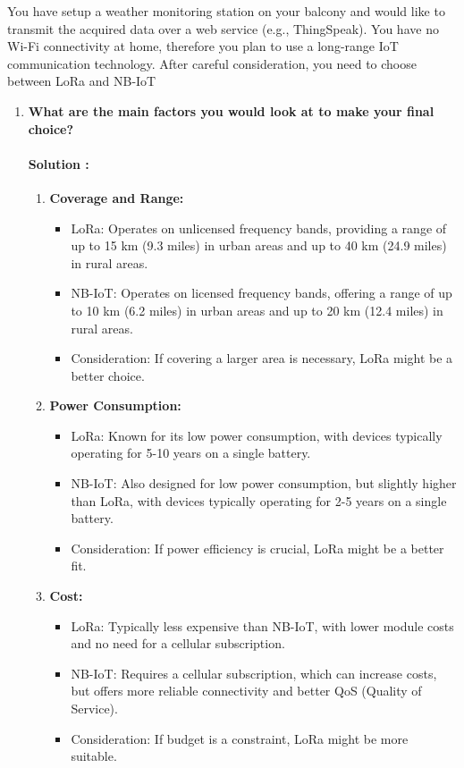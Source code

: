 \documentclass{article}
\begin{document}
You have setup a weather monitoring station on your balcony and would like to transmit the acquired data over a web service (e.g., ThingSpeak). You have no Wi-Fi connectivity at home, therefore you plan to use a long-range IoT communication technology. After careful consideration, you need to choose between LoRa and NB-IoT

\begin{enumerate}
    \item \textbf{What are the main factors you would look at to make your final choice?}

\paragraph{Solution :}

\begin{enumerate}
    \item \textbf{Coverage and Range:}
    \begin{itemize}
        \item LoRa: Operates on unlicensed frequency bands, providing a range of up to 15 km (9.3 miles) in urban areas and up to 40 km (24.9 miles) in rural areas.
        \item NB-IoT: Operates on licensed frequency bands, offering a range of up to 10 km (6.2 miles) in urban areas and up to 20 km (12.4 miles) in rural areas.
        \item Consideration: If covering a larger area is necessary, LoRa might be a better choice.
    \end{itemize}

    \item \textbf{Power Consumption:}
    \begin{itemize}
        \item LoRa: Known for its low power consumption, with devices typically operating for 5-10 years on a single battery.
        \item NB-IoT: Also designed for low power consumption, but slightly higher than LoRa, with devices typically operating for 2-5 years on a single battery.
        \item Consideration: If power efficiency is crucial, LoRa might be a better fit.
    \end{itemize}

    \item \textbf{Cost:}
    \begin{itemize}
        \item LoRa: Typically less expensive than NB-IoT, with lower module costs and no need for a cellular subscription.
        \item NB-IoT: Requires a cellular subscription, which can increase costs, but offers more reliable connectivity and better QoS (Quality of Service).
        \item Consideration: If budget is a constraint, LoRa might be more suitable.
    \end{itemize}


\end{enumerate}
\end{enumerate}
\end{document}
